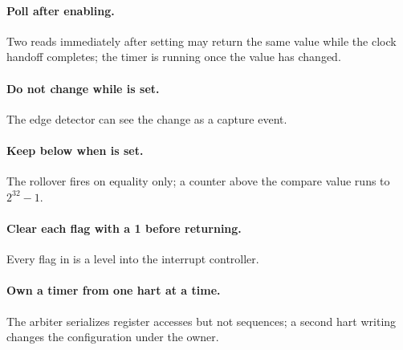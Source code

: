 \paragraph{Poll  after enabling.} Two reads immediately after setting  may return the same value while the clock handoff completes; the timer is running once the value has changed.

\paragraph{Do not change  while  is set.} The edge detector can see the change as a capture event.

\paragraph{Keep  below  when  is set.} The rollover fires on equality only; a counter above the compare value runs to $2^{32} - 1$.

\paragraph{Clear each flag with a 1 before returning.} Every flag in  is a level into the interrupt controller.

\paragraph{Own a timer from one hart at a time.} The arbiter serializes register accesses but not sequences; a second hart writing  changes the configuration under the owner.
